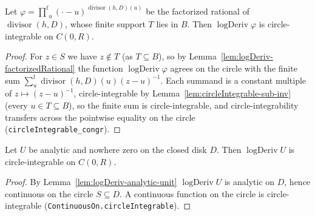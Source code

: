 \begin{lemma}
    \label{lem:circleIntegrable-logDeriv-factorizedRational}
    Let $\varphi = \operatorname*{{\textstyle\prod}^{\mathrm f}}_{u}
      (\cdot-u)^{\operatorname{divisor}(h,D)(u)}$ be the factorized rational of
    $\operatorname{divisor}(h,D)$, whose finite support $T$ lies in $B$. Then
    $\operatorname{logDeriv}\varphi$ is circle-integrable on $C(0,R)$.
\end{lemma}
\begin{proof}
    For $z \in S$ we have $z \notin T$ (as $T \subseteq B$), so by
    Lemma~\ref{lem:logDeriv-factorizedRational} the function
    $\operatorname{logDeriv}\varphi$ agrees on the circle with the finite sum
    $\sum_{u}^{\mathrm f}\operatorname{divisor}(h,D)(u)(z-u)^{-1}$. Each summand is
    a constant multiple of $z \mapsto (z-u)^{-1}$, circle-integrable by
    Lemma~\ref{lem:circleIntegrable-sub-inv} (every $u \in T \subseteq B$), so the
    finite sum is circle-integrable, and circle-integrability transfers across the
    pointwise equality on the circle (\texttt{circleIntegrable\_congr}).
\end{proof}

\begin{lemma}
    \label{lem:circleIntegrable-logDeriv-unit}
    \leanok
    Let $U$ be analytic and nowhere zero on the closed disk $D$. Then
    $\operatorname{logDeriv} U$ is circle-integrable on $C(0,R)$.
\end{lemma}
\begin{proof}
    By Lemma~\ref{lem:logDeriv-analytic-unit} $\operatorname{logDeriv} U$ is
    analytic on $D$, hence continuous on the circle $S \subseteq D$. A continuous
    function on the circle is circle-integrable
    (\texttt{ContinuousOn.circleIntegrable}).
\end{proof}

